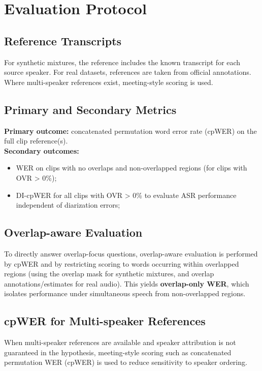 \section{Evaluation Protocol}
\subsection{Reference Transcripts}
For synthetic mixtures, the reference includes the known transcript for each source speaker. For real datasets, references are taken from official annotations. Where multi-speaker references exist, meeting-style scoring is used.

\subsection{Primary and Secondary Metrics}
\textbf{Primary outcome:} concatenated permutation word error rate (cpWER) on the full clip reference(s).\\
\textbf{Secondary outcomes:} 
\begin{itemize}
    \item WER on clips with no overlaps and non-overlapped regions (for clips with OVR > 0\%);
    \item DI-cpWER for all clips with OVR > 0\% to evaluate ASR performance independent of diarization errors;
\end{itemize}

\subsection{Overlap-aware Evaluation}
\label{sec:metrics_overlap}
To directly answer overlap-focus questions, overlap-aware evaluation is performed by cpWER and by restricting scoring to words occurring within overlapped regions (using the overlap mask for synthetic mixtures, and overlap annotations/estimates for real audio). This yields \textbf{overlap-only WER}, which isolates performance under simultaneous speech from non-overlapped regions. 

\subsection{cpWER for Multi-speaker References}
\label{sec:metrics_meeting}
When multi-speaker references are available and speaker attribution is not guaranteed in the hypothesis, meeting-style scoring such as concatenated permutation WER (cpWER) is used to reduce sensitivity to speaker ordering. \cite{Word_Error_Rate_Definitions}
